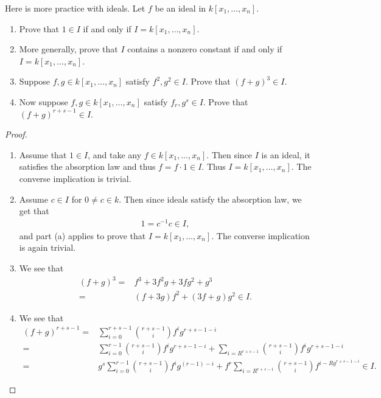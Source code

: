 \begin{exercise}{16}
Here is more practice with ideals. 
Let $f$ be an ideal in $k[x_1,\dots,x_n]$.
\begin{enumerate}
    \item Prove that $1\in I$ if and only if $I = k[x_1,\dots,x_n]$.
    \item More generally, prove that $I$ contains a nonzero constant if and only if $I = k[x_1,\dots,x_n]$.
    \item Suppose $f,g\in k[x_1,\dots,x_n]$ satisfy $f^2,g^2\in I$. Prove that $(f+g)^3\in I$.
    \item Now suppose $f,g\in k[x_1,\dots,x_n]$ satisfy $f_r, g^s\in I$. Prove that $(f+g)^{r+s-1}\in I$.
\end{enumerate}
\end{exercise}
\begin{proof}
    \begin{enumerate}
        \item Assume that $1\in I$, and take any $f\in k[x_1,\dots,x_n]$. 
        Then since $I$ is an ideal, it satisfies the absorption law and thus $f = f\cdot 1\in I$. 
        Thus $I = k[x_1,\dots,x_n]$. 
        The converse implication is trivial.
        \item Assume $c\in I$ for $0\neq c\in k$. 
        Then since ideals satisfy the absorption law, we get that
        \begin{align*}
            1 = c^{-1}c \in I,
        \end{align*}
        and part (a) applies to prove that $I = k[x_1,\dots,x_n]$. 
        The converse implication is again trivial.
        \item We see that
        \begin{align*}
            (f+g)^3
            =& f^3 + 3f^2 g + 3fg^2 + g^3\\
            =& (f + 3g)f^2 + (3f + g)g^2 \in I.
        \end{align*}
        \item We see that
        \begin{align*}
            (f+g)^{r+s-1}
            =& \sum_{i=0}^{r+s-1} \binom{r+s-1}{i} f^i g^{r+s-1-i}\\
            =& \sum_{i=0}^{r-1}  \binom{r+s-1}{i} f^i g^{r+s-1-i} + \sum_{i=R^{r+s-1}}  \binom{r+s-1}{i} f^i g^{r+s-1-i}\\
            =& g^s\sum_{i=0}^{r-1}  \binom{r+s-1}{i} f^i g^{(r-1)-i} + f^r\sum_{i=R^{r+s-1}}  \binom{r+s-1}{i} f^{i-R g^{r+s-1-i}} \in I.
        \end{align*}
    \end{enumerate}
\end{proof}

